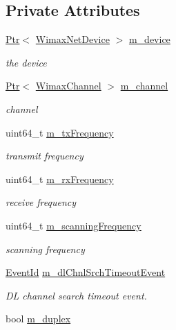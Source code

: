 \subsection*{Private Attributes}
\begin{DoxyCompactItemize}
\item 
\hyperlink{classns3_1_1Ptr}{Ptr}$<$ \hyperlink{classns3_1_1WimaxNetDevice}{Wimax\+Net\+Device} $>$ \hyperlink{classns3_1_1WimaxPhy_a6af0da696b50fa3210a37cbaedccc1f6}{m\+\_\+device}
\begin{DoxyCompactList}\small\item\em the device \end{DoxyCompactList}\item 
\hyperlink{classns3_1_1Ptr}{Ptr}$<$ \hyperlink{classns3_1_1WimaxChannel}{Wimax\+Channel} $>$ \hyperlink{classns3_1_1WimaxPhy_a79acb3a5eb3eabe15877fc1fd5facf10}{m\+\_\+channel}
\begin{DoxyCompactList}\small\item\em channel \end{DoxyCompactList}\item 
uint64\+\_\+t \hyperlink{classns3_1_1WimaxPhy_a1f626a81161a77b01508a30e50d4c06b}{m\+\_\+tx\+Frequency}
\begin{DoxyCompactList}\small\item\em transmit frequency \end{DoxyCompactList}\item 
uint64\+\_\+t \hyperlink{classns3_1_1WimaxPhy_a5c5344a009290fdca59242d4e27dd853}{m\+\_\+rx\+Frequency}
\begin{DoxyCompactList}\small\item\em receive frequency \end{DoxyCompactList}\item 
uint64\+\_\+t \hyperlink{classns3_1_1WimaxPhy_a88ef4899a77c76ed9510ae15562af215}{m\+\_\+scanning\+Frequency}
\begin{DoxyCompactList}\small\item\em scanning frequency \end{DoxyCompactList}\item 
\hyperlink{classns3_1_1EventId}{Event\+Id} \hyperlink{classns3_1_1WimaxPhy_a26fc154b21591f10e0e3598f796d0e52}{m\+\_\+dl\+Chnl\+Srch\+Timeout\+Event}
\begin{DoxyCompactList}\small\item\em DL channel search timeout event. \end{DoxyCompactList}\item 
bool \hyperlink{classns3_1_1WimaxPhy_a0b2fed3e7e237323abb87c7295513fec}{m\+\_\+duplex}

\end{DoxyCompactItemize}
